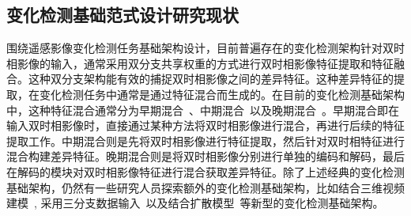 

\subsection{变化检测基础范式设计研究现状}

围绕遥感影像变化检测任务基础架构设计，目前普遍存在的变化检测架构针对双时相影像的输入，通常采用双分支共享权重的方式进行双时相影像特征提取和特征融合。这种双分支架构能有效的捕捉双时相影像之间的差异特征。这种差异特征的提取，在变化检测任务中通常是通过特征混合而生成的。在目前的变化检测基础架构中，这种特征混合通常分为早期混合~\cite{Daudt2018FullyCS,Daudt2018MultitaskLF,peng_end--end_2019,Chen2022Res2UnetAN}、中期混合~\cite{lin_transition_2023,Ding2021BiTemporalSR,Zhu2023EdgeGuidedPN}以及晚期混合~\cite{Chen2021FCCDNFC,zhao_exchanging_2023,Liang2024RaSRNetAE}。早期混合即在输入双时相影像时，直接通过某种方法将双时相影像进行混合，再进行后续的特征提取工作。中期混合则是先将双时相影像进行特征提取，然后针对双时相特征进行混合构建差异特征。晚期混合则是将双时相影像分别进行单独的编码和解码，最后在解码的模块对双时相影像特征进行混合获取差异特征。除了上述经典的变化检测基础架构，仍然有一些研究人员探索额外的变化检测基础架构，比如结合三维视频建模~\cite{Zhu2025Change3DRC}, 采用三分支数据输入~\cite{zhao_triple-stream_2023}以及结合扩散模型~\cite{Bandara2025DDPMCDDD}等新型的变化检测基础架构。

